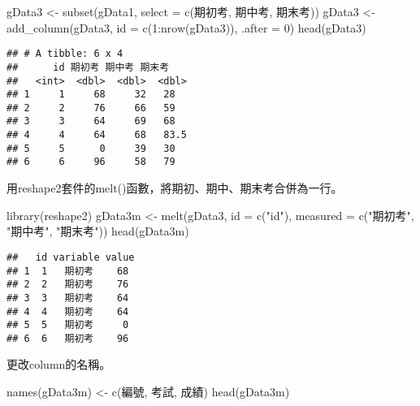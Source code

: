 \documentclass[
]{book}
\newenvironment{Shaded}{\begin{snugshade}}{\end{snugshade}}
\newcommand{\AttributeTok}[1]{\textcolor[rgb]{0.77,0.63,0.00}{#1}}
\newcommand{\DecValTok}[1]{\textcolor[rgb]{0.00,0.00,0.81}{#1}}
\newcommand{\FunctionTok}[1]{\textcolor[rgb]{0.00,0.00,0.00}{#1}}
\newcommand{\NormalTok}[1]{#1}
\newcommand{\OtherTok}[1]{\textcolor[rgb]{0.56,0.35,0.01}{#1}}
\newcommand{\SpecialCharTok}[1]{\textcolor[rgb]{0.00,0.00,0.00}{#1}}
\newcommand{\StringTok}[1]{\textcolor[rgb]{0.31,0.60,0.02}{#1}}
\begin{document}
\begin{Shaded}
\begin{Highlighting}[]
\NormalTok{gData3 }\OtherTok{\textless{}{-}} \FunctionTok{subset}\NormalTok{(gData1, }\AttributeTok{select =} \FunctionTok{c}\NormalTok{(期初考, 期中考, 期末考))}
\NormalTok{gData3 }\OtherTok{\textless{}{-}} \FunctionTok{add\_column}\NormalTok{(gData3, }\AttributeTok{id =} \FunctionTok{c}\NormalTok{(}\DecValTok{1}\SpecialCharTok{:}\FunctionTok{nrow}\NormalTok{(gData3)), }\AttributeTok{.after =} \DecValTok{0}\NormalTok{)}
\FunctionTok{head}\NormalTok{(gData3)}
\end{Highlighting}
\end{Shaded}

\begin{verbatim}
## # A tibble: 6 x 4
##      id 期初考 期中考 期末考
##   <int>  <dbl>  <dbl>  <dbl>
## 1     1     68     32   28  
## 2     2     76     66   59  
## 3     3     64     69   68  
## 4     4     64     68   83.5
## 5     5      0     39   30  
## 6     6     96     58   79
\end{verbatim}

用reshape2套件的melt()函數，將期初、期中、期末考合併為一行。

\begin{Shaded}
\begin{Highlighting}[]
\FunctionTok{library}\NormalTok{(reshape2)}
\NormalTok{gData3m }\OtherTok{\textless{}{-}} \FunctionTok{melt}\NormalTok{(gData3, }\AttributeTok{id =} \FunctionTok{c}\NormalTok{(}\StringTok{"id"}\NormalTok{), }\AttributeTok{measured =} \FunctionTok{c}\NormalTok{(}\StringTok{"期初考"}\NormalTok{, }\StringTok{"期中考"}\NormalTok{, }\StringTok{"期末考"}\NormalTok{))}
\FunctionTok{head}\NormalTok{(gData3m)}
\end{Highlighting}
\end{Shaded}

\begin{verbatim}
##   id variable value
## 1  1   期初考    68
## 2  2   期初考    76
## 3  3   期初考    64
## 4  4   期初考    64
## 5  5   期初考     0
## 6  6   期初考    96
\end{verbatim}

更改column的名稱。

\begin{Shaded}
\begin{Highlighting}[]
\FunctionTok{names}\NormalTok{(gData3m) }\OtherTok{\textless{}{-}} \FunctionTok{c}\NormalTok{(}\StringTok{\textquotesingle{}編號\textquotesingle{}}\NormalTok{, }\StringTok{\textquotesingle{}考試\textquotesingle{}}\NormalTok{, }\StringTok{\textquotesingle{}成績\textquotesingle{}}\NormalTok{)}
\FunctionTok{head}\NormalTok{(gData3m)}
\end{Highlighting}
\end{Shaded}
\end{document}
